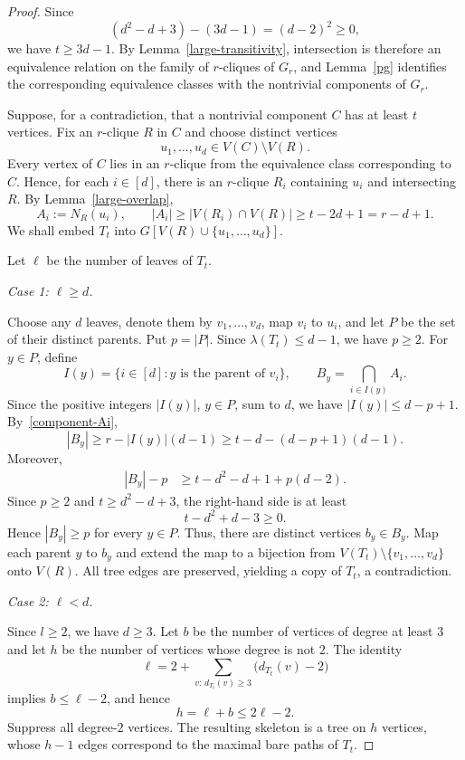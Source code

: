 \documentclass[10pt,a4paper]{amsart}
\begin{document}
\begin{proof}
Since
\[
(d^2-d+3)-(3d-1)=(d-2)^2\ge0,
\]
we have $t\ge3d-1$. By Lemma~\ref{large-transitivity}, intersection is therefore an equivalence relation on the family of $r$-cliques of $G_r$, and Lemma~\ref{pg} identifies the corresponding equivalence classes with the nontrivial components of $G_r$.

Suppose, for a contradiction, that a nontrivial component $C$ has at least $t$ vertices. Fix an $r$-clique $R$ in $C$ and choose distinct vertices
\[
u_1,\ldots,u_d\in V(C)\setminus V(R).
\]
Every vertex of $C$ lies in an $r$-clique from the equivalence class corresponding to $C$. Hence, for each $i\in[d]$, there is an $r$-clique $R_i$ containing $u_i$ and intersecting $R$. By Lemma~\ref{large-overlap},
\begin{equation}\label{component-Ai}
A_i:=N_R(u_i),
\qquad
|A_i|\ge |V(R_i)\cap V(R)|\ge t-2d+1=r-d+1.
\end{equation}
We shall embed $T_t$ into $G[V(R)\cup\{u_1,\ldots,u_d\}]$.

Let $\ell$ be the number of leaves of $T_t$.

\smallskip
\noindent\emph{Case 1: $\ell\ge d$.}

Choose any $d$ leaves, denote them by $v_1,\ldots,v_d$, map $v_i$ to $u_i$, and let $P$ be the set of their distinct parents. Put $p=|P|$. Since $\lambda(T_t)\le d-1$, we have $p\ge2$. For $y\in P$, define
\[
I(y)=\{i\in[d]:y\text{ is the parent of }v_i\},
\qquad
B_y=\bigcap_{i\in I(y)}A_i.
\]
Since the positive integers $|I(y)|$, $y\in P$, sum to $d$, we have $|I(y)|\le d-p+1$. By~\eqref{component-Ai},
\[
|B_y|\ge r-|I(y)|(d-1)
\ge t-d-(d-p+1)(d-1).
\]
Moreover,
\[
\begin{aligned}
|B_y|-p
&\ge t-d^2-d+1+p(d-2).
\end{aligned}
\]
Since $p\ge2$ and $t\ge d^2-d+3$, the right-hand side is at least
\[
t-d^2+d-3\ge0.
\]
Hence $|B_y|\ge p$ for every $y\in P$. Thus,  there are distinct vertices $b_y\in B_y$. Map each parent $y$ to $b_y$ and extend the map to a bijection from $V(T_t)\setminus\{v_1,\ldots,v_d\}$ onto $V(R)$. All tree edges are preserved, yielding a copy of $T_t$, a contradiction.

\smallskip
\noindent\emph{Case 2: $\ell<d$.}

Since $l\ge 2$, we have $d\ge3$. Let $b$ be the number of vertices of degree at least $3$ and let $h$ be the number of vertices whose degree is not $2$. The identity
\[
\ell=2+\sum_{v:\,d_{T_t}(v)\ge3}\bigl(d_{T_t}(v)-2\bigr)
\]
implies $b\le\ell-2$, and hence
\[
h=\ell+b\le2\ell-2.
\]
Suppress all degree-$2$ vertices. The resulting skeleton is a tree on $h$ vertices, whose $h-1$ edges correspond to the maximal bare paths of $T_t$.


\end{proof}
\end{document}

